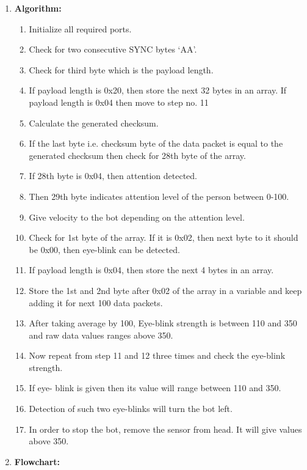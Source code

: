 \documentclass[14pt]{article}
\begin{document}
\begin{enumerate}
	\item \textbf{{\large Algorithm:}}


\begin{enumerate}
	\item Initialize all required ports.
	\item Check for two consecutive SYNC bytes ‘AA’.
	\item Check for third byte which is the payload length.
	\item If payload length is 0x20, then store the next 32 bytes in an array. If payload length is 0x04 then move to step no. 11
	\item Calculate the generated checksum.
	\item If the last byte i.e. checksum byte of the data packet is equal to the generated checksum then check for 28th byte of the array.
	\item If 28th byte is 0x04, then attention detected.
	\item Then 29th byte indicates attention level of the person between 0-100.
	\item Give velocity to the bot depending on the attention level.
	\item Check for 1st byte of the array. If it is 0x02, then next byte to it should be 0x00, then eye-blink can be detected.
	\item If payload length is 0x04, then store the next 4 bytes in an array.
	\item Store the 1st and 2nd byte after 0x02 of the array in a variable and keep adding it for next 100 data packets.
	\item After taking average by 100, Eye-blink strength is between 110 and 350 and raw data values ranges above 350.
	\item Now repeat from step 11 and 12 three times and check the eye-blink strength.
	\item If eye- blink is given then its value will range between 110 and 350. 
	\item Detection of such two eye-blinks will turn the bot left.
	\item In order to stop the bot, remove the sensor from head. It will give values above 350.
	
\end{enumerate}

\break

	\item \textbf{{\large Flowchart:}}
\end{enumerate}
\end{document}
